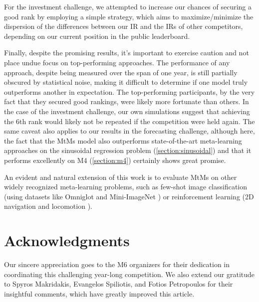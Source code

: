 \documentclass[3p,times,twocolumn]{elsarticle}
\begin{document}
For the investment challenge, we attempted to increase our chances of securing a good rank by employing a simple strategy, which aims to maximize/minimize the dispersion of the differences between our IR and the IRs of other competitors, depending on our current position in the public leaderboard.

Finally, despite the promising results, it's important to exercise caution and not place undue focus on top-performing approaches.
The performance of any approach, despite being measured over the span of one year, is still partially obscured by statistical noise, making it difficult to determine if one model truly outperforms another in expectation.
The top-performing participants, by the very fact that they secured good rankings, were likely more fortunate than others.
In the case of the investment challenge, our own simulations suggest that achieving the 6th rank would likely not be repeated if the competition were held again.
The same caveat also applies to our results in the forecasting challenge, although here, the fact that the MtMs model also outperforms state-of-the-art meta-learning approaches on the sinusoidal regression problem (\ref{section:sinusoidal}) and that it performs excellently on M4 (\ref{section:m4}) certainly shows great promise.

An evident and natural extension of this work is to evaluate MtMs on other widely recognized meta-learning problems, such as few-shot image classification (using datasets like Omniglot \citep{lake2011one} and Mini-ImageNet \citep{ravi2016optimization}) or reinforcement learning (2D navigation and locomotion \citep[see, e.g.,][]{finnModelAgnosticMetaLearningFast2017}).

\section{Acknowledgments}\label{section:acknowledgments}
Our sincere appreciation goes to the M6 organizers for their dedication in coordinating this challenging year-long competition.
We also extend our gratitude to Spyros Makridakis, Evangelos Spiliotis, and Fotios Petropoulos for their insightful comments, which have greatly improved this article.

\appendix
\end{document}
